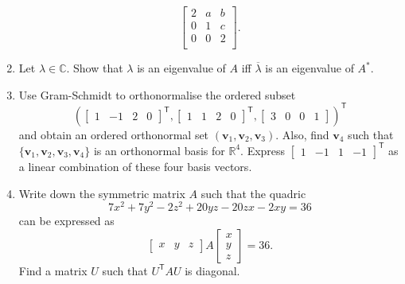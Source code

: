 \documentclass[12pt]{article}
\begin{document}
\begin{enumerate}[leftmargin=*]
	 \begin{equation*} 
	 	\begin{bmatrix}
	 		2 & a & b \\
	 		0 & 1 & c \\
	 		0 & 0 & 2 \\
	 	\end{bmatrix}.
	 \end{equation*}
	 \item Let $\lambda \in \mathbb{C}$. Show that $\lambda$ is an eigenvalue of $A$ iff $\overline{\lambda}$ is an eigenvalue of $A^{\ast}$. 
	 \item Use Gram-Schmidt to orthonormalise the ordered subset
	 \begin{equation*} 
	 	(\begin{bmatrix}
	 		1 & -1 & 2 & 0
	 	\end{bmatrix}^{\mathsf{T}},
	 	\begin{bmatrix}
	 		1 & 1 & 2 & 0
	 	\end{bmatrix}^{\mathsf{T}},
	 	\begin{bmatrix}
	 		3 & 0 & 0 & 1
	 	\end{bmatrix})^{\mathsf{T}}
	 \end{equation*}
	 and obtain an ordered orthonormal set $(\mathbf{v}_{1}, \mathbf{v}_{2}, \mathbf{v}_{3})$. Also, find $\mathbf{v}_{4}$ such that $\{\mathbf{v}_{1}, \mathbf{v}_{2}, \mathbf{v}_{3}, \mathbf{v}_{4}\}$ is an orthonormal basis for $\mathbb{R}^{4}$. \newline
	 Express $\begin{bmatrix}
	 		1 & -1 & 1 & -1
	 	\end{bmatrix}^{\mathsf{T}}$ as a linear combination of these four basis vectors.
	 \item Write down the symmetric matrix $A$ such that the quadric
	 \begin{equation*} 
	 	7x^{2} + 7y^{2} - 2z^{2} + 20yz - 20zx - 2xy = 36
	 \end{equation*}
	 can be expressed as
	 \begin{equation*} 
	 	\begin{bmatrix}
	 		x & y & z
	 	\end{bmatrix} A 
	 	\begin{bmatrix}
	 		x \\
	 		y \\
	 		z
	 	\end{bmatrix} = 36.
	 \end{equation*}
	 Find a matrix $U$ such that $U^{\mathsf{T}}AU$ is diagonal.

\end{enumerate}
\end{document}
